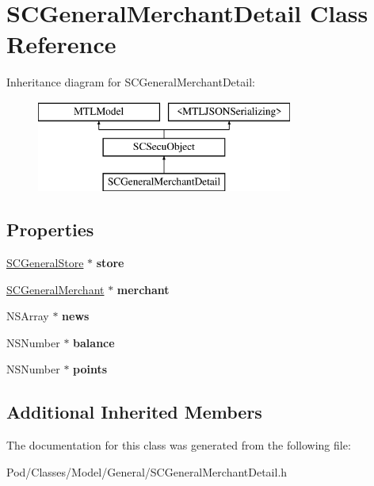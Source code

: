 \hypertarget{interface_s_c_general_merchant_detail}{}\section{S\+C\+General\+Merchant\+Detail Class Reference}
\label{interface_s_c_general_merchant_detail}
Inheritance diagram for S\+C\+General\+Merchant\+Detail\+:\begin{figure}[H]
\begin{center}
\leavevmode
\includegraphics[height=3.000000cm]{interface_s_c_general_merchant_detail}
\end{center}
\end{figure}
\subsection*{Properties}
\begin{DoxyCompactItemize}
\item 
\hyperlink{interface_s_c_general_store}{S\+C\+General\+Store} $\ast$ {\bfseries store}\hypertarget{interface_s_c_general_merchant_detail_a19a2eb10416bcb77b49093aeb838fb52}{}\label{interface_s_c_general_merchant_detail_a19a2eb10416bcb77b49093aeb838fb52}

\item 
\hyperlink{interface_s_c_general_merchant}{S\+C\+General\+Merchant} $\ast$ {\bfseries merchant}\hypertarget{interface_s_c_general_merchant_detail_a35db2659b131802bd6cd015df0ad16dc}{}\label{interface_s_c_general_merchant_detail_a35db2659b131802bd6cd015df0ad16dc}

\item 
N\+S\+Array $\ast$ {\bfseries news}\hypertarget{interface_s_c_general_merchant_detail_ad701f0dba320dfff02d42fc1f046a5d3}{}\label{interface_s_c_general_merchant_detail_ad701f0dba320dfff02d42fc1f046a5d3}

\item 
N\+S\+Number $\ast$ {\bfseries balance}\hypertarget{interface_s_c_general_merchant_detail_a78db55e97052638afce2e25ed9c310dc}{}\label{interface_s_c_general_merchant_detail_a78db55e97052638afce2e25ed9c310dc}

\item 
N\+S\+Number $\ast$ {\bfseries points}\hypertarget{interface_s_c_general_merchant_detail_aeca9e9e7958de4d854528402caa69e64}{}\label{interface_s_c_general_merchant_detail_aeca9e9e7958de4d854528402caa69e64}

\end{DoxyCompactItemize}
\subsection*{Additional Inherited Members}


The documentation for this class was generated from the following file\+:\begin{DoxyCompactItemize}
\item 
Pod/\+Classes/\+Model/\+General/S\+C\+General\+Merchant\+Detail.\+h\end{DoxyCompactItemize}
